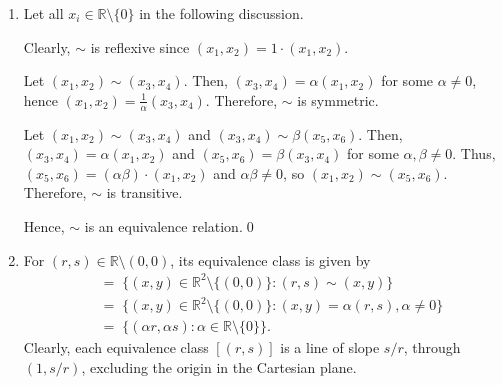 \documentclass[10pt]{article}
\begin{document}
    \begin{enumerate}
        \item Let all $x_i \in \mathbb{R}\setminus\{0\}$ in the following discussion.

        Clearly, $\sim$ is reflexive since $(x_1, x_2) = 1\cdot (x_1, x_2)$.

        Let $(x_1, x_2)\sim(x_3, x_4)$. Then, $(x_3, x_4) = \alpha (x_1, x_2)$
        for some $\alpha \neq 0$, hence $(x_1, x_2) = \frac{1}{\alpha}(x_3,
        x_4)$. Therefore, $\sim$ is symmetric.

        Let $(x_1, x_2) \sim (x_3, x_4)$ and $(x_3, x_4) \sim \beta(x_5,
        x_6)$. Then, $(x_3, x_4) = \alpha(x_1, x_2)$ and $(x_5, x_6) =
        \beta(x_3, x_4)$ for some $\alpha, \beta \neq 0$. Thus, $(x_5, x_6) =
        (\alpha\beta)\cdot (x_1, x_2)$ and $\alpha\beta \neq 0$, so $(x_1,
        x_2) \sim (x_5, x_6)$.  Therefore, $\sim$ is transitive.

        Hence, $\sim$ is an equivalence relation.\qed

        \item For $(r, s) \in \mathbb{R}\setminus(0,0)$, its equivalence class
        is given by \begin{align*}
            [(r, s)]
                \;&=\; \{(x, y) \in \mathbb{R}^2\setminus\{(0, 0)\} : (r, s)\sim(x, y)\} \\
                \;&=\; \{(x, y) \in \mathbb{R}^2\setminus\{(0, 0)\} : (x, y) = \alpha(r, s), \alpha \neq 0\} \\
                \;&=\; \{(\alpha r, \alpha s) : \alpha \in \mathbb{R}\setminus\{0\}\}.
        \end{align*}
        Clearly, each equivalence class $[(r, s)]$ is a line of slope $s/r$,
        through $(1, s/r)$, excluding the origin in the Cartesian plane.

        \begin{center}
        \end{center}

    \end{enumerate}
\end{document}
